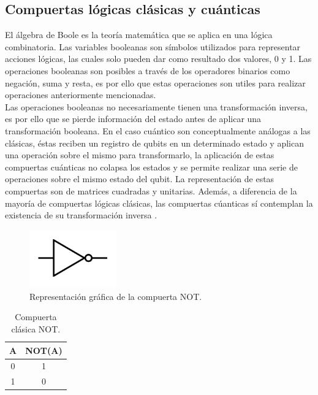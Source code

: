 \subsection{Compuertas lógicas clásicas y cuánticas}
El álgebra de Boole es la teoría matemática que se aplica en una lógica combinatoria. Las variables booleanas son símbolos utilizados para representar
acciones lógicas, las cuales solo pueden dar como resultado dos valores, 0 y 1. Las operaciones booleanas son posibles a través de los operadores
binarios como negación, suma y resta, es por ello que estas operaciones son utiles para realizar operaciones anteriormente mencionadas.\\
Las operaciones booleanas no necesariamente tienen una transformación inversa, es por ello que se pierde información del estado antes de aplicar una transformación booleana. En el
caso cuántico son conceptualmente análogas a las clásicas, éstas reciben un registro de qubits en un determinado estado y aplican una operación sobre el mismo para transformarlo,
la aplicación de estas compuertas cuánticas no colapsa los estados y se permite realizar una serie de operaciones sobre el mismo estado del qubit. La 
representación de estas compuertas son de matrices cuadradas y unitarias. Además, a diferencia de la mayoría de compuertas lógicas clásicas, las compuertas cúanticas sí 
contemplan la existencia de su transformación inversa \cite{Bonillo2013,Koch2020}.\\
\begin{minipage}{0.5\linewidth}
    \begin{figure}[H]
        \centering
        \includegraphics[height=2.5cm]{images/not.png}
        \caption{Representación gráfica de la compuerta NOT.}
    \end{figure}
    \begin{table}[H]
        \centering
        \begin{tabular}{cc} \hline
            A & NOT(A)\\ \hline
            0 & 1 \\
            1 & 0 \\ \hline
        \end{tabular}
        \caption{Compuerta clásica NOT.}
    \end{table}
\end{minipage}
